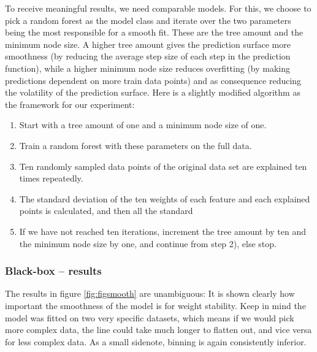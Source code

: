 \documentclass[]{krantz}
\begin{document}
To receive meaningful results, we need comparable models. For this, we
choose to pick a random forest as the model class and iterate over the
two parameters being the most responsible for a smooth fit. These are
the tree amount and the minimum node size. A higher tree amount gives
the prediction surface more smoothness (by reducing the average step
size of each step in the prediction function), while a higher minimum
node size reduces overfitting (by making predictions dependent on more
train data points) and as consequence reducing the volatility of the
prediction surface. Here is a slightly modified algorithm as the
framework for our experiment:

\begin{enumerate}
\def\labelenumi{\arabic{enumi})}
\item
  Start with a tree amount of one and a minimum node size of one.
\item
  Train a random forest with these parameters on the full data.
\item
  Ten randomly sampled data points of the original data set are
  explained ten times repeatedly.
\item
  The standard deviation of the ten weights of each feature and each
  explained points is calculated, and then all the standard
\item
  If we have not reached ten iterations, increment the tree amount by
  ten and the minimum node size by one, and continue from step 2), else
  stop.
\end{enumerate}

\subsubsection{Black-box -- results}\label{black-box-results}

The results in figure \ref{fig:figsmooth} are unambiguous: It is shown
clearly how important the smoothness of the model is for weight
stability. Keep in mind the model was fitted on two very specific
datasets, which means if we would pick more complex data, the line could
take much longer to flatten out, and vice versa for less complex data.
As a small sidenote, binning is again consistently inferior.
\end{document}
